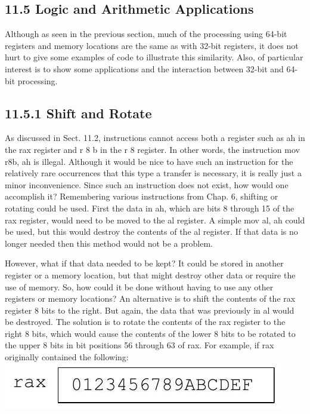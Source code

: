 \documentclass[10pt]{article}
\begin{document}
\subsection*{11.5 Logic and Arithmetic Applications}
Although as seen in the previous section, much of the processing using 64-bit registers and memory locations are the same as with 32-bit registers, it does not hurt to give some examples of code to illustrate this similarity. Also, of particular interest is to show some applications and the interaction between 32-bit and 64-bit processing.

\subsection*{11.5.1 Shift and Rotate}
As discussed in Sect. 11.2, instructions cannot access both a register such as ah in the rax register and r 8 b in the r 8 register. In other words, the instruction mov r8b, ah is illegal. Although it would be nice to have such an instruction for the\\
relatively rare occurrences that this type a transfer is necessary, it is really just a minor inconvenience. Since such an instruction does not exist, how would one accomplish it? Remembering various instructions from Chap. 6, shifting or rotating could be used. First the data in ah, which are bits 8 through 15 of the rax register, would need to be moved to the al register. A simple mov al, ah could be used, but this would destroy the contents of the al register. If that data is no longer needed then this method would not be a problem.

However, what if that data needed to be kept? It could be stored in another register or a memory location, but that might destroy other data or require the use of memory. So, how could it be done without having to use any other registers or memory locations? An alternative is to shift the contents of the rax register 8 bits to the right. But again, the data that was previously in al would be destroyed. The solution is to rotate the contents of the rax register to the right 8 bits, which would cause the contents of the lower 8 bits to be rotated to the upper 8 bits in bit positions 56 through 63 of rax. For example, if rax originally contained the following:\\
\includegraphics[max width=\textwidth, center]{2025_03_24_ebe50cc223a6fbc49eecg-259}
\end{document}
